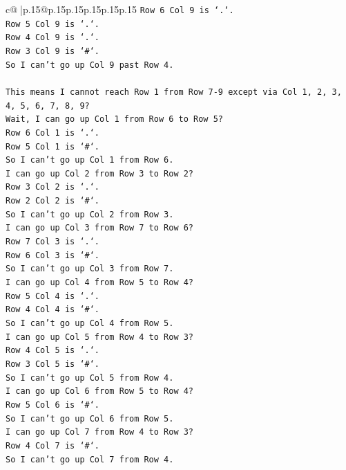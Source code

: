 \documentclass{article}
\begin{document}
{\begin{supertabular}{c@{$\;$}|p{.15\linewidth}@{}p{.15\linewidth}p{.15\linewidth}p{.15\linewidth}p{.15\linewidth}p{.15\linewidth}}
{{{\texttt{Row 6 Col 9 is `.`.} \\
\texttt{Row 5 Col 9 is `.`.} \\
\texttt{Row 4 Col 9 is `.`.} \\
\texttt{Row 3 Col 9 is `\#`.} \\
\texttt{So I can't go up Col 9 past Row 4.} \\
\\ 
\texttt{This means I cannot reach Row 1 from Row 7{-}9 except via Col 1, 2, 3, 4, 5, 6, 7, 8, 9?} \\
\texttt{Wait, I can go up Col 1 from Row 6 to Row 5?} \\
\texttt{Row 6 Col 1 is `.`.} \\
\texttt{Row 5 Col 1 is `\#`.} \\
\texttt{So I can't go up Col 1 from Row 6.} \\
\texttt{I can go up Col 2 from Row 3 to Row 2?} \\
\texttt{Row 3 Col 2 is `.`.} \\
\texttt{Row 2 Col 2 is `\#`.} \\
\texttt{So I can't go up Col 2 from Row 3.} \\
\texttt{I can go up Col 3 from Row 7 to Row 6?} \\
\texttt{Row 7 Col 3 is `.`.} \\
\texttt{Row 6 Col 3 is `\#`.} \\
\texttt{So I can't go up Col 3 from Row 7.} \\
\texttt{I can go up Col 4 from Row 5 to Row 4?} \\
\texttt{Row 5 Col 4 is `.`.} \\
\texttt{Row 4 Col 4 is `\#`.} \\
\texttt{So I can't go up Col 4 from Row 5.} \\
\texttt{I can go up Col 5 from Row 4 to Row 3?} \\
\texttt{Row 4 Col 5 is `.`.} \\
\texttt{Row 3 Col 5 is `\#`.} \\
\texttt{So I can't go up Col 5 from Row 4.} \\
\texttt{I can go up Col 6 from Row 5 to Row 4?} \\
\texttt{Row 5 Col 6 is `\#`.} \\
\texttt{So I can't go up Col 6 from Row 5.} \\
\texttt{I can go up Col 7 from Row 4 to Row 3?} \\
\texttt{Row 4 Col 7 is `\#`.} \\
\texttt{So I can't go up Col 7 from Row 4.} \\
}}}
\end{supertabular}}
\end{document}
